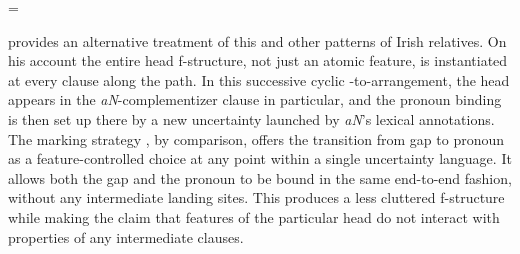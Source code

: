 \documentclass[output=paper,hidelinks]{langscibook}
\begin{document}
 =\hbox{}
 \ea\label{irish3}
\z

\citet{Asudeh12} provides an alternative treatment of this and other patterns of Irish relatives. On his account the entire head f-structure, not just an atomic feature, is instantiated at every clause along the path. In this successive cyclic \COMP-to-\COMP arrangement, the head appears in the \textit{aN}-complementizer clause in particular, and the pronoun binding  is then set up there by a new uncertainty launched by \textit{aN}'s lexical annotations.  The marking strategy , by comparison, offers the transition from gap to pronoun as a feature-controlled choice at any point within a single uncertainty language.  It allows both the gap and the pronoun to be bound in the same end-to-end fashion, without any intermediate landing sites.  This produces a less cluttered f-structure while making the claim that features of the particular head do not interact with properties of any intermediate clauses.
                                            
\end{document}
